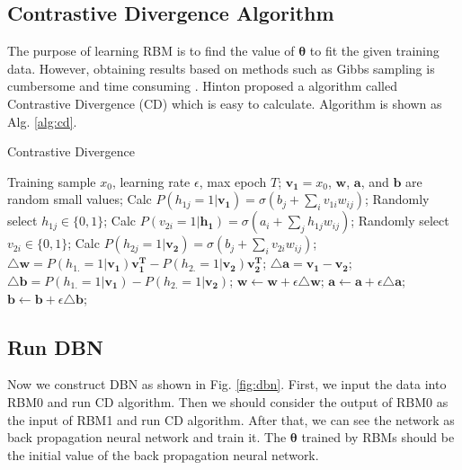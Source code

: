 \documentclass{modified}
\begin{document}
\subsection{Contrastive Divergence Algorithm}
The purpose of learning RBM is to find the value of $\boldsymbol{\theta}$ to fit the given training data. However, obtaining results based on methods such as Gibbs sampling is cumbersome and time consuming \cite{zhangchunxia}. Hinton proposed a algorithm called Contrastive Divergence (CD) \cite{Hinton2002Training} which is easy to calculate. Algorithm is shown as Alg. \ref{alg:cd}.
\begin{algorithm}
	\caption{Contrastive Divergence}
	\label{alg:cd}
	\begin{algorithmic}[1]
		\STATE Training sample $x_0$, learning rate $\epsilon$, max epoch $T$;
		\STATE $\mathbf{v_1}=x_0$, $\mathbf{w}$, $\mathbf{a}$, and $\mathbf{b}$ are random small values;
			\STATE Calc $P\left(h_{1j}=1 | \mathbf{v_1} \right)=\sigma\left(b_{j}+\sum_{i} v_{1i} w_{i j}\right)$;
			\STATE Randomly select $h_{1j}\in\{0,1\}$;
		\ENDFOR
			\STATE Calc $P\left(v_{2i}=1 | \mathbf{h_1} \right)=\sigma\left(a_{i}+\sum_{j} h_{1j} w_{i j}\right)$;
			\STATE Randomly select $v_{2i}\in\{0,1\}$;
		\ENDFOR
			\STATE Calc $P\left(h_{2j}=1 | \mathbf{v_2} \right)=\sigma\left(b_{j}+\sum_{i} v_{2i} w_{i j}\right)$;
		\ENDFOR
		\STATE $\mathbf{\triangle w}=P(h_{1.}=1|\mathbf{v_1})\mathbf{v_1^T}-P(h_{2.}=1|\mathbf{v_2})\mathbf{v_2^T}$;
		\STATE $\mathbf{\triangle a}=\mathbf{v_1}-\mathbf{v_2}$;
		\STATE $\mathbf{\triangle b}=P(h_{1.}=1|\mathbf{v_1})-P(h_{2.}=1|\mathbf{v_2})$;
		\STATE $\mathbf{w}\leftarrow \mathbf{w}+\epsilon\triangle\mathbf{w}$;
		\STATE $\mathbf{a}\leftarrow \mathbf{a}+\epsilon\triangle\mathbf{a}$;
		\STATE $\mathbf{b}\leftarrow \mathbf{b}+\epsilon\triangle\mathbf{b}$;
		\ENDFOR
	\end{algorithmic} 
\end{algorithm} 
\subsection{Run DBN}
Now we construct DBN as shown in Fig. \ref{fig:dbn}. First, we input the data into RBM0 and run CD algorithm. Then we should consider the output of RBM0 as the input of RBM1 and run CD algorithm. After that, we can see the network as back propagation neural network and train it. The $\boldsymbol{\theta}$ trained by RBMs should be the initial value of the back propagation neural network.
\end{document}
